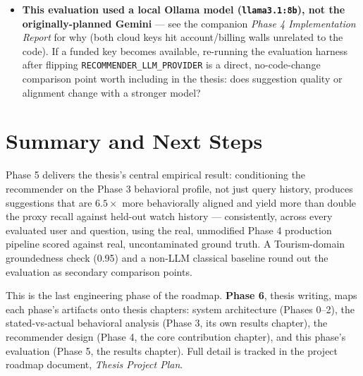 \documentclass[11pt,a4paper]{article}
\newcommand{\code}[1]{\texttt{#1}}
\begin{document}
\begin{itemize}
        value ``Movie'' appears in their \code{actual\_top} list --- cosmetically worth noting as a
        baseline artifact, not a bug to fix).
    \item \textbf{This evaluation used a local Ollama model (\code{llama3.1:8b}), not the
        originally-planned Gemini} --- see the companion \emph{Phase 4 Implementation Report} for
        why (both cloud keys hit account/billing walls unrelated to the code). If a funded key
        becomes available, re-running the evaluation harness after flipping
        \code{RECOMMENDER\_LLM\_PROVIDER} is a direct, no-code-change comparison point worth
        including in the thesis: does suggestion quality or alignment change with a stronger model?
\end{itemize}

\section{Summary and Next Steps}

Phase 5 delivers the thesis's central empirical result: conditioning the recommender on the Phase 3
behavioral profile, not just query history, produces suggestions that are $6.5\times$ more
behaviorally aligned and yield more than double the proxy recall against held-out watch history ---
consistently, across every evaluated user and question, using the real, unmodified Phase 4
production pipeline scored against real, uncontaminated ground truth. A Tourism-domain groundedness
check (0.95) and a non-LLM classical baseline round out the evaluation as secondary comparison
points.

This is the last engineering phase of the roadmap. \textbf{Phase 6}, thesis writing, maps each
phase's artifacts onto thesis chapters: system architecture (Phases 0--2), the stated-vs-actual
behavioral analysis (Phase 3, its own results chapter), the recommender design (Phase 4, the core
contribution chapter), and this phase's evaluation (Phase 5, the results chapter). Full detail is
tracked in the project roadmap document, \emph{Thesis Project Plan}.
\end{document}
